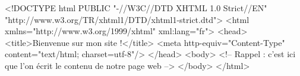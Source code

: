 \documentclass[a4paper]{article}
\begin{document}
\begin{htmlcode}
<!DOCTYPE html PUBLIC "-//W3C//DTD XHTML 1.0 Strict//EN" "http://www.w3.org/TR/xhtml1/DTD/xhtml1-strict.dtd">
<html xmlns="http://www.w3.org/1999/xhtml" xml:lang="fr">
   <head>
      <title>Bienvenue sur mon site !</title>
      <meta http-equiv="Content-Type" content="text/html; charset=utf-8"/>
   </head>
   <body>
      <!-- Rappel : c'est ici que l'on écrit le contenu de notre page web -->
   </body>
</html>
\end{htmlcode}
\end{document}
